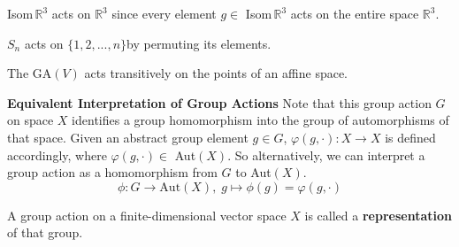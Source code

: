   \begin{example}
    Isom$\,\mathbb{R}^{3}$ acts on $\mathbb{R}^{3}$ since every element $g \in$ Isom$\,\mathbb{R}^{3}$ acts on the entire space $\mathbb{R}^{3}$. 
  \end{example}

  \begin{example}
    $S_n$ acts on $\{1, 2, ..., n\}$by permuting its elements.
  \end{example}

  \begin{example}
    The GA$(V)$ acts transitively on the points of an affine space.
  \end{example}

  \textbf{Equivalent Interpretation of Group Actions}
  Note that this group action $G$ on space $X$ identifies a group homomorphism into the group of automorphisms of that space. Given an abstract group element $g \in G$, $\varphi(g, \cdot): X \longrightarrow X$ is defined accordingly, where $\varphi(g, \cdot) \in $ Aut$(X)$. So alternatively, we can interpret a group action as a homomorphism from $G$ to Aut$(X)$. 
  \begin{equation}
    \phi: G \longrightarrow \text{Aut}(X), \; g \mapsto \phi(g) = \varphi(g,\cdot)
  \end{equation}

  \begin{definition}[Representation]
    A group action on a finite-dimensional vector space $X$ is called a \textbf{representation} of that group. 
  \end{definition}

